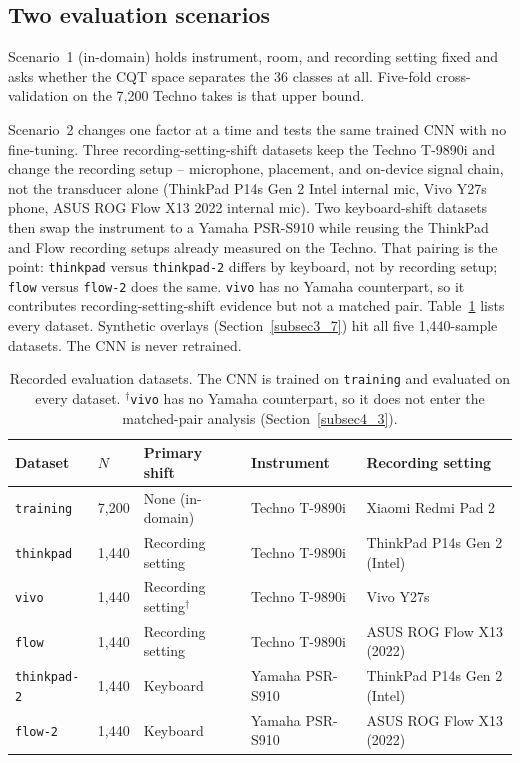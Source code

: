 \documentclass[pdflatex,sn-mathphys-num,iicol]{sn-jnl}
\theoremstyle{thmstyleone}
\theoremstyle{thmstyletwo}
\theoremstyle{thmstylethree}
\begin{document}
\subsection{Two evaluation scenarios}\label{subsec3_0}

Scenario~1 (in-domain) holds instrument, room, and recording setting fixed and asks whether the CQT space separates the 36 classes at all. Five-fold cross-validation on the 7{,}200 Techno takes is that upper bound.

Scenario~2 changes one factor at a time and tests the same trained CNN with no fine-tuning. Three recording-setting-shift datasets keep the Techno T-9890i and change the recording setup -- microphone, placement, and on-device signal chain, not the transducer alone (ThinkPad P14s Gen 2 Intel internal mic, Vivo Y27s phone, ASUS ROG Flow X13 2022 internal mic). Two keyboard-shift datasets then swap the instrument to a Yamaha PSR-S910 while reusing the ThinkPad and Flow recording setups already measured on the Techno. That pairing is the point: \texttt{thinkpad} versus \texttt{thinkpad-2} differs by keyboard, not by recording setup; \texttt{flow} versus \texttt{flow-2} does the same. \texttt{vivo} has no Yamaha counterpart, so it contributes recording-setting-shift evidence but not a matched pair. Table~\ref{tab:scenarios} lists every dataset. Synthetic overlays (Section~\ref{subsec3_7}) hit all five 1{,}440-sample datasets. The CNN is never retrained.

\begin{table}[t]
\caption{Recorded evaluation datasets. The CNN is trained on \texttt{training} and evaluated on every dataset. $^\dagger$\texttt{vivo} has no Yamaha counterpart, so it does not enter the matched-pair analysis (Section~\ref{subsec4_3}).}\label{tab:scenarios}
\begin{tabular*}{\textwidth}{@{\extracolsep{\fill}}lllll@{}}
\toprule
Dataset & $N$ & Primary shift & Instrument & Recording setting \\
\midrule
\texttt{training} & 7{,}200 & None (in-domain) & Techno T-9890i & Xiaomi Redmi Pad 2 \\
\texttt{thinkpad} & 1{,}440 & Recording setting & Techno T-9890i & ThinkPad P14s Gen 2 (Intel) \\
\texttt{vivo} & 1{,}440 & Recording setting$^\dagger$ & Techno T-9890i & Vivo Y27s \\
\texttt{flow} & 1{,}440 & Recording setting & Techno T-9890i & ASUS ROG Flow X13 (2022) \\
\texttt{thinkpad-2} & 1{,}440 & Keyboard & Yamaha PSR-S910 & ThinkPad P14s Gen 2 (Intel) \\
\texttt{flow-2} & 1{,}440 & Keyboard & Yamaha PSR-S910 & ASUS ROG Flow X13 (2022) \\
\bottomrule
\end{tabular*}
\end{table}
\end{document}
